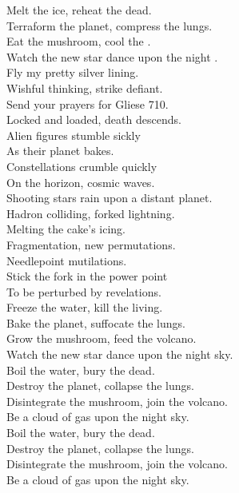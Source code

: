 

Melt the ice, reheat the dead. \\
Terraform the planet, compress the lungs. \\
Eat the mushroom, cool the . \\
Watch the new star dance upon the night . \\

Fly my pretty silver lining. \\
Wishful thinking, strike defiant. \\
Send your prayers for Gliese 710. \\
Locked and loaded, death descends. \\

Alien figures stumble sickly \\
As their planet bakes. \\
Constellations crumble quickly \\
On the horizon, cosmic waves. \\

Shooting stars rain upon a distant planet. \\
Hadron colliding, forked lightning. \\
Melting the cake's icing. \\

Fragmentation, new permutations. \\
Needlepoint mutilations. \\
Stick the fork in the power point \\
To be perturbed by revelations. \\

Freeze the water, kill the living. \\
Bake the planet, suffocate the lungs. \\
Grow the mushroom, feed the volcano. \\
Watch the new star dance upon the night sky. \\

Boil the water, bury the dead. \\
Destroy the planet, collapse the lungs. \\
Disintegrate the mushroom, join the volcano. \\
Be a cloud of gas upon the night sky. \\

Boil the water, bury the dead. \\
Destroy the planet, collapse the lungs. \\
Disintegrate the mushroom, join the volcano. \\
Be a cloud of gas upon the night sky. \\
